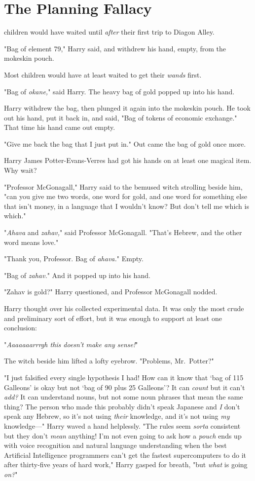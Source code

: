 \chapter{The Planning Fallacy}

 children would have waited until \emph{after} their first trip to
Diagon Alley.

"Bag of element 79," Harry said, and withdrew his hand, empty, from the
mokeskin pouch.

Most children would have at least waited to get their \emph{wands} first.

"Bag of \emph{okane,}" said Harry. The heavy bag of gold popped up into his
hand.

Harry withdrew the bag, then plunged it again into the mokeskin pouch. He took
out his hand, put it back in, and said, "Bag of tokens of economic exchange."
That time his hand came out empty.

"Give me back the bag that I just put in." Out came the bag of gold once more.

Harry James Potter-Evans-Verres had got his hands on at least one magical
item. Why wait?

"Professor McGonagall," Harry said to the bemused witch strolling beside him,
"can you give me two words, one word for gold, and one word for something else
that isn't money, in a language that I wouldn't know? But don't tell me which
is which."

"\emph{Ahava} and \emph{zahav,}" said Professor McGonagall. "That's Hebrew, and
the other word means love."

"Thank you, Professor. Bag of \emph{ahava.}" Empty.

"Bag of \emph{zahav.}" And it popped up into his hand.

"Zahav is gold?" Harry questioned, and Professor McGonagall nodded.

Harry thought over his collected experimental data. It was only the most crude
and preliminary sort of effort, but it was enough to support at least one
conclusion:

"\emph{Aaaaaaarrrgh this doesn't make any sense!}"

The witch beside him lifted a lofty eyebrow. "Problems, Mr.~Potter?"

"I just falsified every single hypothesis I had! How can it know that `bag of
115 Galleons' is okay but not `bag of 90 plus 25 Galleons'? It can \emph{count}
but it can't \emph{add?} It can understand nouns, but not some noun phrases
that mean the same thing? The person who made this probably didn't speak
Japanese and \emph{I} don't speak any Hebrew, so it's not using \emph{their}
knowledge, and it's not using \emph{my} knowledge---" Harry waved a hand
helplessly. "The rules seem \emph{sorta} consistent but they don't \emph{mean}
anything! I'm not even going to ask how a \emph{pouch} ends up with voice
recognition and natural language understanding when the best Artificial
Intelligence programmers can't get the fastest supercomputers to do it after
thirty-five years of hard work," Harry gasped for breath, "but \emph{what} is
going \emph{on?}"

